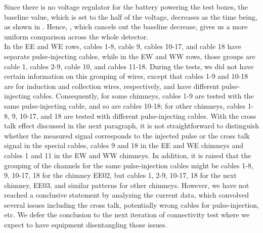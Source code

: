 Since there is no voltage regulator for the battery powering the test
boxes, the baseline value, which is set to the half of the voltage,
decreases as the time being, as shown in .
Hence, , which cancels out the baseline
decrease, gives us a more uniform comparison across the whole detector.\\

In the EE and WE rows, cables 1-8, cable 9, cables 10-17, and cable 18
have separate pulse-injecting cables, while in the EW and WW rows, those
groups are cable 1, cables 2-9, cable 10, and cables 11-18.
During the tests, we did not have certain information on this grouping of
wires, except that cables 1-9 and 10-18 are for induction and collection
wires, respectively, and have different pulse-injecting cables.
Consequently, for some chimneys, cables 1-9 are tested with
the same pulse-injecting cable, and so are cables 10-18; 
for other chimneys, cables 1-8, 9, 10-17, and 18 are tested with different
pulse-injecting cables.
With the cross talk effect discussed in the next paragraph,
it is not straightforward to distinguish whether the measured signal
corresponds to the injected pulse or the cross talk signal in the special
cables, cables 9 and 18 in the EE and WE chimneys and cables 1 and 11
in the EW and WW chimneys.
In addition, it is raised that the grouping of the channels for the same
pulse-injection cables might be cables 1-8, 9, 10-17, 18 for the chimney
EE02, but cables 1, 2-9, 10-17, 18 for the next chimney, EE03, and
similar patterns for other chimneys.
However, we have not reached a conclusive statement by analyzing the
current data, which convolved several issues including the cross talk,
potentially wrong cables for pulse-injection, etc.
We defer the conclusion to the next iteration of connectivity test
where we expect to have equipment disentangling those issues.\\


